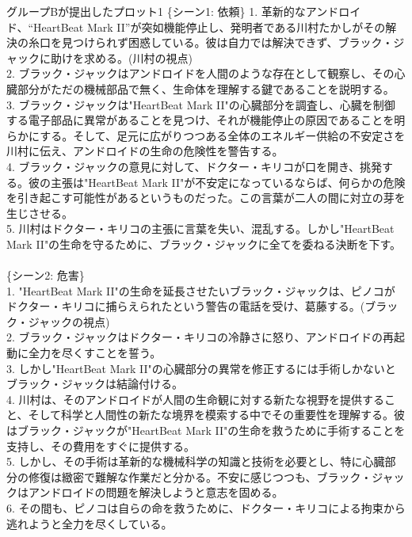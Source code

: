 \documentclass[a4j,12pt]{jsreport}
\begin{document}
\begin{breakitembox}
   [l]{グループBが提出したプロット1}
   \noindent\{シーン1: 依頼\}
   1. 革新的なアンドロイド、“HeartBeat Mark II”が突如機能停止し、発明者である川村たかしがその解決の糸口を見つけられず困惑している。彼は自力では解決できず、ブラック・ジャックに助けを求める。(川村の視点)\\
   2. ブラック・ジャックはアンドロイドを人間のような存在として観察し、その心臓部分がただの機械部品で無く、生命体を理解する鍵であることを説明する。\\
   3. ブラック・ジャックは"HeartBeat Mark II"の心臓部分を調査し、心臓を制御する電子部品に異常があることを見つけ、それが機能停止の原因であることを明らかにする。そして、足元に広がりつつある全体のエネルギー供給の不安定さを川村に伝え、アンドロイドの生命の危険性を警告する。\\
   4. ブラック・ジャックの意見に対して、ドクター・キリコが口を開き、挑発する。彼の主張は"HeartBeat Mark II"が不安定になっているならば、何らかの危険を引き起こす可能性があるというものだった。この言葉が二人の間に対立の芽を生じさせる。\\
   5. 川村はドクター・キリコの主張に言葉を失い、混乱する。しかし"HeartBeat Mark II"の生命を守るために、ブラック・ジャックに全てを委ねる決断を下す。\\
   \\
   \{シーン2: 危害\}\\
   1. "HeartBeat Mark II"の生命を延長させたいブラック・ジャックは、ピノコがドクター・キリコに捕らえられたという警告の電話を受け、葛藤する。(ブラック・ジャックの視点)\\
   2. ブラック・ジャックはドクター・キリコの冷静さに怒り、アンドロイドの再起動に全力を尽くすことを誓う。\\
   3. しかし"HeartBeat Mark II"の心臓部分の異常を修正するには手術しかないとブラック・ジャックは結論付ける。\\
   4. 川村は、そのアンドロイドが人間の生命観に対する新たな視野を提供すること、そして科学と人間性の新たな境界を模索する中でその重要性を理解する。彼はブラック・ジャックが"HeartBeat Mark II"の生命を救うために手術することを支持し、その費用をすぐに提供する。\\
   5. しかし、その手術は革新的な機械科学の知識と技術を必要とし、特に心臓部分の修復は緻密で難解な作業だと分かる。不安に感じつつも、ブラック・ジャックはアンドロイドの問題を解決しようと意志を固める。\\
   6. その間も、ピノコは自らの命を救うために、ドクター・キリコによる拘束から逃れようと全力を尽くしている。\\

\end{breakitembox}
\end{document}
